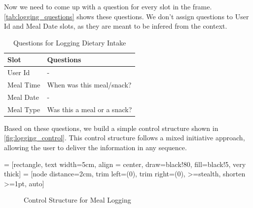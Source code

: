 Now we need to come up with a question for every slot in the frame.
\autoref{tab:logging_questions} shows these questions.
We don't assign questions to User Id and Meal Date slots, as they are meant to be infered from the context.

\begin{table}[htbp]
  \caption[Question for Logging Dietary Intake]{Questions for Logging Dietary Intake}\label{tab:logging_questions}
  \centering
  \begin{tabular}{l|l}
    Slot&Questions\\ \toprule
    User Id&-\\ \hline
    Meal Time&When was this meal/snack?\\ \hline
    Meal Date&-\\ \hline
    Meal Type&Was this a meal or a snack?\\ \hline
  \end{tabular}
\end{table}

Based on these questions, we build a simple control structure shown in \autoref{fig:logging_control}.
This control structure follows a mixed initiative approach, 
allowing the user to deliver the information in any sequence.

\usetikzlibrary{automata,positioning}
 = [rectangle,
                    text width=5cm,
                    align = center,
                    draw=black!80,
                    fill=black!5,
                    very thick]
 = [node distance=2cm,
                      trim left=(0),
                      trim right=(0),
                      >=stealth,
                      shorten >=1pt,
                      auto]
\begin{figure}[htbp]
  \centering
  \caption[Control Structure for Meal Logging]{Control Structure for Meal Logging}\label{fig:logging_control}
\end{figure}


